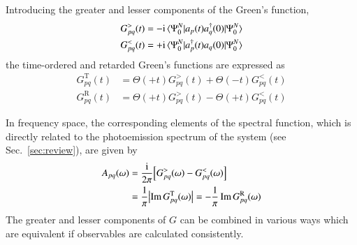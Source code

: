 \documentclass[aip,jcp,reprint,noshowkeys,superscriptaddress]{revtex4-2}
\newcommand{\ii}{\mathrm{i}}
\begin{document}
Introducing the greater and lesser components of the Green's function,
\begin{subequations}
\begin{align}
	G_{pq}^>(t) & = - \ii \mel*{\Psi_0^N}{a_p(t) a_q^\dag(0)}{\Psi_0^N}
	\\
	G_{pq}^<(t) & = + \ii \mel*{\Psi_0^N}{a_p^\dag(t) a_q(0)}{\Psi_0^N}
\end{align}
\end{subequations}
the time-ordered and retarded Green's functions are expressed as 
\begin{subequations}
\begin{align}
	G_{pq}^\text{T}(t) & = \Theta(+t) G_{pq}^>(t) + \Theta(-t) G_{pq}^<(t)
	\\
	G_{pq}^\text{R}(t) & = \Theta(+t) G_{pq}^>(t) - \Theta(+t) G_{pq}^<(t)
\end{align}
\end{subequations}

In frequency space, the corresponding elements of the spectral function, which is directly related to the photoemission spectrum of the system (see Sec.~\ref{sec:review}), are given by
\begin{equation} \label{eq:Apq}
\begin{split}
	A_{pq}(\omega) 
	& = \frac{\ii}{2\pi} \qty[ G_{pq}^>(\omega) - G_{pq}^<(\omega) ]
	\\
	& = \frac{1}{\pi} \abs{ \Im G_{pq}^\text{T}(\omega) }
	= - \frac{1}{\pi} \Im G_{pq}^\text{R}(\omega) 
\end{split}
\end{equation}
The greater and lesser components of $G$ can be combined in various ways which are equivalent if observables are calculated consistently. \cite{Zhou_2018} 
\end{document}
